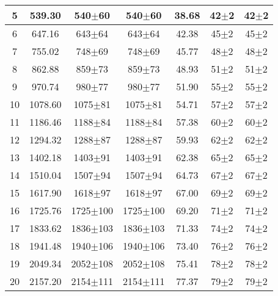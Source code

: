 \begin{table}
\begin{tabular}{|c|c|c|c|c|c|c|}
5&539.30&540$\pm$60&540$\pm$60&38.68&42$\pm$2&42$\pm$2\\ \hline 
6&647.16&643$\pm$64&643$\pm$64&42.38&45$\pm$2&45$\pm$2\\ \hline 
7&755.02&748$\pm$69&748$\pm$69&45.77&48$\pm$2&48$\pm$2\\ \hline 
8&862.88&859$\pm$73&859$\pm$73&48.93&51$\pm$2&51$\pm$2\\ \hline 
9&970.74&980$\pm$77&980$\pm$77&51.90&55$\pm$2&55$\pm$2\\ \hline 
10&1078.60&1075$\pm$81&1075$\pm$81&54.71&57$\pm$2&57$\pm$2\\ \hline 
11&1186.46&1188$\pm$84&1188$\pm$84&57.38&60$\pm$2&60$\pm$2\\ \hline 
12&1294.32&1288$\pm$87&1288$\pm$87&59.93&62$\pm$2&62$\pm$2\\ \hline 
13&1402.18&1403$\pm$91&1403$\pm$91&62.38&65$\pm$2&65$\pm$2\\ \hline 
14&1510.04&1507$\pm$94&1507$\pm$94&64.73&67$\pm$2&67$\pm$2\\ \hline 
15&1617.90&1618$\pm$97&1618$\pm$97&67.00&69$\pm$2&69$\pm$2\\ \hline 
16&1725.76&1725$\pm$100&1725$\pm$100&69.20&71$\pm$2&71$\pm$2\\ \hline 
17&1833.62&1836$\pm$103&1836$\pm$103&71.33&74$\pm$2&74$\pm$2\\ \hline 
18&1941.48&1940$\pm$106&1940$\pm$106&73.40&76$\pm$2&76$\pm$2\\ \hline 
19&2049.34&2052$\pm$108&2052$\pm$108&75.41&78$\pm$2&78$\pm$2\\ \hline 
20&2157.20&2154$\pm$111&2154$\pm$111&77.37&79$\pm$2&79$\pm$2\\ \hline 
\end{tabular} 
\end{table} 
